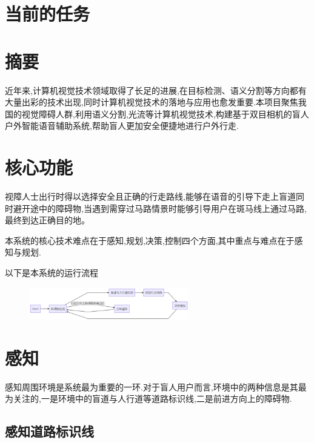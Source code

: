 \documentclass[]{article}
\date{}
\begin{document}
\tableofcontents

\hypertarget{ux5f53ux524dux7684ux4efbux52a1}{%
\section{当前的任务}\label{ux5f53ux524dux7684ux4efbux52a1}}

\hypertarget{ux6458ux8981}{%
\section{摘要}\label{ux6458ux8981}}

近年来,计算机视觉技术领域取得了长足的进展,在目标检测、语义分割等方向都有大量出彩的技术出现,同时计算机视觉技术的落地与应用也愈发重要.本项目聚焦我国的视觉障碍人群,利用语义分割,光流等计算机视觉技术,构建基于双目相机的盲人户外智能语音辅助系统,帮助盲人更加安全便捷地进行户外行走.

\hypertarget{ux6838ux5fc3ux529fux80fd}{%
\section{核心功能}\label{ux6838ux5fc3ux529fux80fd}}

视障人士出行时得以选择安全且正确的行走路线,能够在语音的引导下走上盲道同时避开途中的障碍物,当遇到需穿过马路情景时能够引导用户在斑马线上通过马路,最终到达正确目的地。

本系统的核心技术难点在于感知,规划,决策,控制四个方面,其中重点与难点在于感知与规划.

以下是本系统的运行流程

\begin{figure}
\centering
\includegraphics[width=2.73958in,height=\textheight]{16515440501322.png}
\caption{}
\end{figure}

\hypertarget{ux611fux77e5}{%
\section{感知}\label{ux611fux77e5}}

感知周围环境是系统最为重要的一环.对于盲人用户而言,环境中的两种信息是其最为关注的,一是环境中的盲道与人行道等道路标识线,二是前进方向上的障碍物.

\hypertarget{ux611fux77e5ux9053ux8defux6807ux8bc6ux7ebf}{%
\subsection{感知道路标识线}\label{ux611fux77e5ux9053ux8defux6807ux8bc6ux7ebf}}
\end{document}
